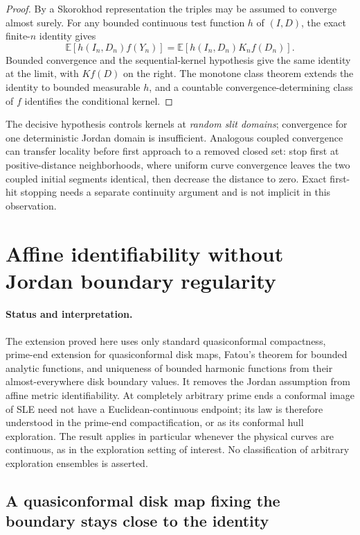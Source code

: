 \documentclass[11pt]{article}
\theoremstyle{definition}\newtheorem{definition}[theorem]{Definition}
\theoremstyle{remark}\newtheorem{remark}[theorem]{Remark}
\begin{document}
\begin{proof}
By a Skorokhod representation the triples may be assumed to converge almost
surely.  For any bounded continuous test function $h$ of $(I,D)$, the exact
finite-$n$ identity gives
\[
 \mathbb E[h(I_n,D_n)f(Y_n)]
 =\mathbb E[h(I_n,D_n)K_n f(D_n)].
\]
Bounded convergence and the sequential-kernel hypothesis give the same
identity at the limit, with $Kf(D)$ on the right.  The monotone class theorem
extends the identity to bounded measurable $h$, and a countable
convergence-determining class of $f$ identifies the conditional kernel.
\end{proof}

The decisive hypothesis controls kernels at \emph{random slit domains};
convergence for one deterministic Jordan domain is insufficient.  Analogous
coupled convergence can transfer locality before first approach to a removed
closed set: stop first at positive-distance neighborhoods, where uniform
curve convergence leaves the two coupled initial segments identical, then
decrease the distance to zero.  Exact first-hit stopping needs a separate
continuity argument and is not implicit in this observation.


\section{Affine identifiability without Jordan boundary regularity}
\label{sec:rough-affine}

\paragraph{Status and interpretation.}
The extension proved here uses only standard quasiconformal compactness,
prime-end extension for quasiconformal disk maps, Fatou's theorem for bounded
analytic functions, and uniqueness of bounded harmonic functions from their
almost-everywhere disk boundary values.  It removes the Jordan assumption
from affine metric identifiability.  At completely arbitrary prime ends a
conformal image of SLE need not have a Euclidean-continuous endpoint; its
law is therefore understood in the prime-end compactification, or as its
conformal hull exploration.  The result applies in particular whenever the
physical curves are continuous, as in the exploration setting of interest.
No classification of arbitrary exploration ensembles is asserted.

\subsection{A quasiconformal disk map fixing the boundary stays close to the identity}
\end{document}
